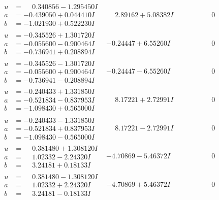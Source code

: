 \documentclass[1p]{elsarticle_modified}
\theoremstyle{definition}
\begin{document}
$$\begin{array}{c|c|c}
\begin{aligned}
u &= \phantom{-}0.340856 - 1.295450 I \\
a &= -0.439050 + 0.044410 I \\
b &= -1.021930 + 0.522230 I\end{aligned}
 & \phantom{-}2.89162 + 5.08382 I & \phantom{-0.000000 } 0 \\ \hline\begin{aligned}
u &= -0.345526 + 1.301720 I \\
a &= -0.055600 - 0.900464 I \\
b &= -0.736941 + 0.208894 I\end{aligned}
 & -0.24447 + 6.55260 I & \phantom{-0.000000 } 0 \\ \hline\begin{aligned}
u &= -0.345526 - 1.301720 I \\
a &= -0.055600 + 0.900464 I \\
b &= -0.736941 - 0.208894 I\end{aligned}
 & -0.24447 - 6.55260 I & \phantom{-0.000000 } 0 \\ \hline\begin{aligned}
u &= -0.240433 + 1.331850 I \\
a &= -0.521834 - 0.837953 I \\
b &= -1.098430 + 0.565000 I\end{aligned}
 & \phantom{-}8.17221 + 2.72991 I & \phantom{-0.000000 } 0 \\ \hline\begin{aligned}
u &= -0.240433 - 1.331850 I \\
a &= -0.521834 + 0.837953 I \\
b &= -1.098430 - 0.565000 I\end{aligned}
 & \phantom{-}8.17221 - 2.72991 I & \phantom{-0.000000 } 0 \\ \hline\begin{aligned}
u &= \phantom{-}0.381480 + 1.308120 I \\
a &= \phantom{-}1.02332 - 2.24320 I \\
b &= \phantom{-}3.24181 + 0.18133 I\end{aligned}
 & -4.70869 - 5.46372 I & \phantom{-0.000000 } 0 \\ \hline\begin{aligned}
u &= \phantom{-}0.381480 - 1.308120 I \\
a &= \phantom{-}1.02332 + 2.24320 I \\
b &= \phantom{-}3.24181 - 0.18133 I\end{aligned}
 & -4.70869 + 5.46372 I & \phantom{-0.000000 } 0\\

\end{array}$$
\end{document}

